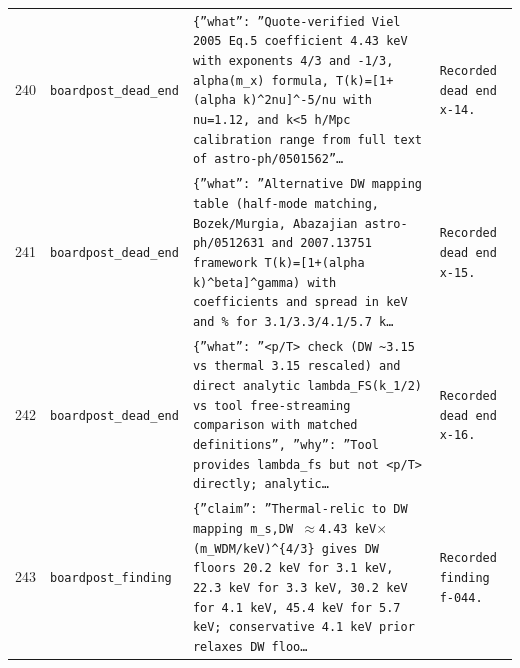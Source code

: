 \documentclass[11pt,a4paper]{article}
\begin{document}
\begin{longtable}{@{}p{}p{}p{}p{}@{}}
240 & \texttt{board}\newline\texttt{post\_\allowbreak{}dead\_\allowbreak{}end} & \texttt{\{''what'':\allowbreak{} ''Quote-verified Viel 2005 Eq.5 coefficient 4.43 keV with exponents 4/\allowbreak{}3 and -1/\allowbreak{}3,\allowbreak{} alpha(m\_\allowbreak{}x)\allowbreak{} formula,\allowbreak{} T(k)\allowbreak{}=\allowbreak{}[1+(alpha k)\allowbreak{}\textasciicircum{}\allowbreak{}2nu]\allowbreak{}\textasciicircum{}\allowbreak{}-5/\allowbreak{}nu with nu=\allowbreak{}1.12,\allowbreak{} and k\textless{}\allowbreak{}5 h/\allowbreak{}Mpc calibration range from full text of astro-ph/\allowbreak{}0501562''\ldots{}\allowbreak{}} & \texttt{Recorded dead end x-14.} \\
241 & \texttt{board}\newline\texttt{post\_\allowbreak{}dead\_\allowbreak{}end} & \texttt{\{''what'':\allowbreak{} ''Alternative DW mapping table (half-mode matching,\allowbreak{} Bozek/\allowbreak{}Murgia,\allowbreak{} Abazajian astro-ph/\allowbreak{}0512631 and 2007.13751 framework T(k)\allowbreak{}=\allowbreak{}[1+(alpha k)\allowbreak{}\textasciicircum{}\allowbreak{}beta]\allowbreak{}\textasciicircum{}\allowbreak{}gamma)\allowbreak{} with coefficients and spread in keV and \% for 3.1/\allowbreak{}3.3/\allowbreak{}4.1/\allowbreak{}5.7 k\ldots{}\allowbreak{}} & \texttt{Recorded dead end x-15.} \\
242 & \texttt{board}\newline\texttt{post\_\allowbreak{}dead\_\allowbreak{}end} & \texttt{\{''what'':\allowbreak{} ''\textless{}\allowbreak{}p/\allowbreak{}T\textgreater{}\allowbreak{} check (DW \textasciitilde{}\allowbreak{}3.15 vs thermal 3.15 rescaled)\allowbreak{} and direct analytic lambda\_\allowbreak{}FS(k\_\allowbreak{}1/\allowbreak{}2)\allowbreak{} vs tool free-streaming comparison with matched definitions'',\allowbreak{} ''why'':\allowbreak{} ''Tool provides lambda\_\allowbreak{}fs but not \textless{}\allowbreak{}p/\allowbreak{}T\textgreater{}\allowbreak{} directly;\allowbreak{} analytic\ldots{}\allowbreak{}} & \texttt{Recorded dead end x-16.} \\
243 & \texttt{board}\newline\texttt{post\_\allowbreak{}finding} & \texttt{\{''claim'':\allowbreak{} ''Thermal-relic to DW mapping m\_\allowbreak{}s,\allowbreak{}DW $\approx$4.43 keV$\times$(m\_\allowbreak{}WDM/\allowbreak{}keV)\allowbreak{}\textasciicircum{}\allowbreak{}\{4/\allowbreak{}3\}\allowbreak{} gives DW floors 20.2 keV for 3.1 keV,\allowbreak{} 22.3 keV for 3.3 keV,\allowbreak{} 30.2 keV for 4.1 keV,\allowbreak{} 45.4 keV for 5.7 keV;\allowbreak{} conservative 4.1 keV prior relaxes DW floo\ldots{}\allowbreak{}} & \texttt{Recorded finding f-044.} \\

\end{longtable}
\end{document}
